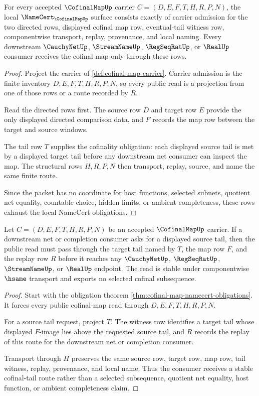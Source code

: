 \begin{theorem}
\label{thm:cofinal-map-namecert-obligations}
For every accepted $\CofinalMapUp$ carrier $C=(D,E,F,T,H,R,P,N)$, the local $\NameCert_{\CofinalMapUp}$ surface consists exactly of carrier admission for the two directed rows, displayed cofinal map row, eventual-tail witness row, componentwise transport, replay, provenance, and local naming. Every downstream $\CauchyNetUp$, $\StreamNameUp$, $\RegSeqRatUp$, or $\RealUp$ consumer receives the cofinal map only through these rows.
\end{theorem}
\begin{proof}
Project the carrier of \autoref{def:cofinal-map-carrier}. Carrier admission is the finite inventory $D,E,F,T,H,R,P,N$, so every public read is a projection from one of those rows or a route recorded by $R$.

Read the directed rows first. The source row $D$ and target row $E$ provide the only displayed directed comparison data, and $F$ records the map row between the target and source windows.

The tail row $T$ supplies the cofinality obligation: each displayed source tail is met by a displayed target tail before any downstream net consumer can inspect the map. The structural rows $H,R,P,N$ then transport, replay, source, and name the same finite route.

Since the packet has no coordinate for host functions, selected subnets, quotient net equality, countable choice, hidden limits, or ambient completeness, these rows exhaust the local NameCert obligations.
\end{proof}

\begin{theorem}
\label{thm:cofinal-map-tail-stability}
Let $C=(D,E,F,T,H,R,P,N)$ be an accepted $\CofinalMapUp$ carrier. If a downstream net or completion consumer asks for a displayed source tail, then the public read must pass through the target tail named by $T$, the map row $F$, and the replay row $R$ before it reaches any $\CauchyNetUp$, $\RegSeqRatUp$, $\StreamNameUp$, or $\RealUp$ endpoint. The read is stable under componentwise $\hsame$ transport and exports no selected cofinal subsequence.
\end{theorem}
\begin{proof}
Start with the obligation theorem \autoref{thm:cofinal-map-namecert-obligations}. It forces every public cofinal-map read through $D,E,F,T,H,R,P,N$.

For a source tail request, project $T$. The witness row identifies a target tail whose displayed $F$-image lies above the requested source tail, and $R$ records the replay of this route for the downstream net or completion consumer.

Transport through $H$ preserves the same source row, target row, map row, tail witness, replay, provenance, and local name. Thus the consumer receives a stable cofinal-tail route rather than a selected subsequence, quotient net equality, host function, or ambient completeness claim.
\end{proof}

